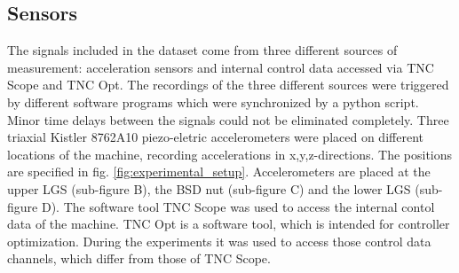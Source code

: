 \subsection{Sensors}
The signals included in the dataset come from three different sources of measurement: acceleration sensors and internal control data accessed via TNC Scope and TNC Opt. The recordings of the three different sources were triggered by different software programs which were synchronized by a python script. Minor time delays between the signals could not be eliminated completely. Three triaxial Kistler 8762A10 piezo-eletric accelerometers were placed on different locations of the machine, recording accelerations in x,y,z-directions. The positions are specified in fig. \ref{fig:experimental_setup}. Accelerometers are placed at the upper LGS (sub-figure B), the BSD nut (sub-figure C) and the lower LGS (sub-figure D). The software tool TNC Scope was used to access the internal contol data of the machine. TNC Opt is a software tool, which is intended for controller optimization. During the experiments it was used to access those control data channels, which differ from those of TNC Scope.

